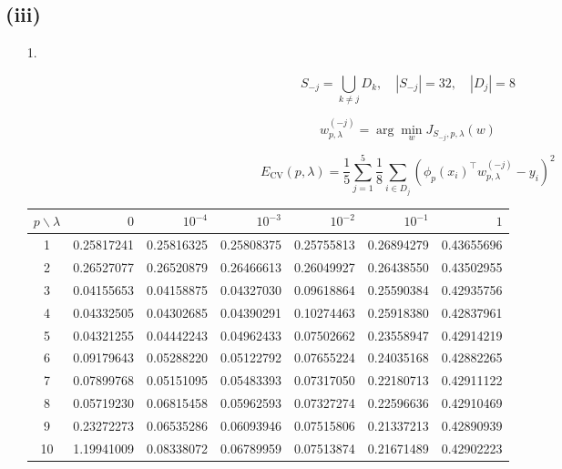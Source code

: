 \documentclass[11pt]{article}
\begin{document}
\subsection*{(iii)}

\begin{enumerate}
    \item[1. ]

    $$
    S_{-j} = \bigcup_{k\neq j}D_k
    ,\quad |S_{-j}| = 32
    ,\quad |D_j| = 8
    $$

    $$
    w^{(-j)}_{p,\lambda}
    = \arg\min_w J_{S_{-j},p,\lambda}(w)
    $$

    $$
    E_{\text{CV}}(p,\lambda)
    = \frac{1}{5}\sum_{j=1}^5\frac{1}{8}
    \sum_{i\in D_j}\left(\phi_p(x_i)^\top w^{(-j)}_{p,\lambda}-y_i\right)^2
    $$

    \begin{center}
    \small
    \setlength{\tabcolsep}{5pt}
    \begin{tabular}{c r r r r r r}
        \toprule
        $p\backslash\lambda$ & $0$ & $10^{-4}$ & $10^{-3}$ & $10^{-2}$ & $10^{-1}$ & $1$ \\
        \midrule
        1 & 0.25817241 & 0.25816325 & 0.25808375 & 0.25755813 & 0.26894279 & 0.43655696 \\
        2 & 0.26527077 & 0.26520879 & 0.26466613 & 0.26049927 & 0.26438550 & 0.43502955 \\
        3 & 0.04155653 & 0.04158875 & 0.04327030 & 0.09618864 & 0.25590384 & 0.42935756 \\
        4 & 0.04332505 & 0.04302685 & 0.04390291 & 0.10274463 & 0.25918380 & 0.42837961 \\
        5 & 0.04321255 & 0.04442243 & 0.04962433 & 0.07502662 & 0.23558947 & 0.42914219 \\
        6 & 0.09179643 & 0.05288220 & 0.05122792 & 0.07655224 & 0.24035168 & 0.42882265 \\
        7 & 0.07899768 & 0.05151095 & 0.05483393 & 0.07317050 & 0.22180713 & 0.42911122 \\
        8 & 0.05719230 & 0.06815458 & 0.05962593 & 0.07327274 & 0.22596636 & 0.42910469 \\
        9 & 0.23272273 & 0.06535286 & 0.06093946 & 0.07515806 & 0.21337213 & 0.42890939 \\
        10 & 1.19941009 & 0.08338072 & 0.06789959 & 0.07513874 & 0.21671489 & 0.42902223 \\
        \bottomrule
    \end{tabular}
    \end{center}


\end{enumerate}
\end{document}
